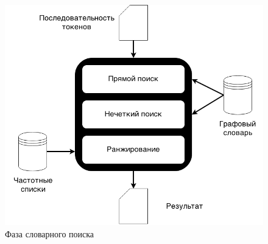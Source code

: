 \begin{figure}[H]
	\centering
	\includegraphics[scale=0.5]{img/dictphase.png}
	\caption{Фаза словарного поиска}
\end{figure}

